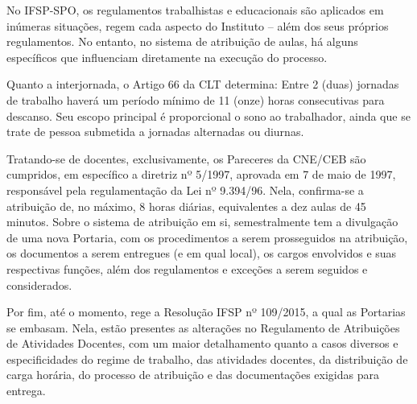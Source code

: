 \documentclass[12pt]{article}
\begin{document}
\par No IFSP-SPO, os regulamentos trabalhistas e educacionais são aplicados em inúmeras situações, regem cada aspecto do Instituto – além dos seus próprios regulamentos. No entanto, no sistema de atribuição de aulas, há alguns específicos que influenciam diretamente na execução do processo.
\par Quanto a interjornada, o Artigo 66 da CLT determina: Entre 2 (duas) jornadas de trabalho haverá um período mínimo de 11 (onze) horas consecutivas para descanso. \cite{batista2_2021} Seu escopo principal é proporcional o sono ao trabalhador, ainda que se trate de pessoa submetida a jornadas alternadas ou diurnas. \cite{batista_2021}
\par Tratando-se de docentes, exclusivamente, os Pareceres da CNE/CEB são cumpridos, em específico a diretriz nº 5/1997, aprovada em 7 de maio de 1997, responsável pela regulamentação da Lei nº 9.394/96. Nela, confirma-se a atribuição de, no máximo, 8 horas diárias, equivalentes a dez aulas de 45 minutos.
Sobre o sistema de atribuição em si, semestralmente tem a divulgação de uma nova Portaria, com os procedimentos a serem prosseguidos na atribuição, os documentos a serem entregues (e em qual local), os cargos envolvidos e suas respectivas funções, além dos regulamentos e exceções a serem seguidos e considerados. 
\par Por fim, até o momento, rege a Resolução IFSP nº 109/2015, a qual as Portarias se embasam. Nela, estão presentes as alterações no Regulamento de Atribuições de Atividades Docentes, com um maior detalhamento quanto a casos diversos e especificidades do regime de trabalho, das atividades docentes, da distribuição de carga horária, do processo de atribuição e das documentações exigidas para entrega.
\end{document}
